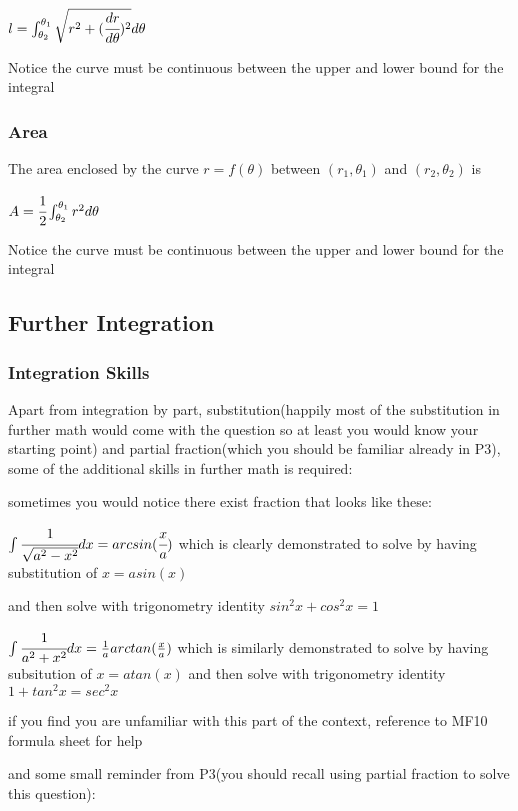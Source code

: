 \documentclass[]{article}
\begin{document}
\(l = \int^{\theta_1}_{\theta_2} \sqrt{r^2 + (\cfrac{dr}{d\theta})^2}d\theta\)

Notice the curve must be continuous between the upper and lower bound
for the integral

\subsubsection{Area}\label{header-n1018}

The area enclosed by the curve \(r = f(\theta)\) between
\((r_1,\theta_1)\) and \((r_2,\theta_2)\) is

\(A= \cfrac{1}{2}\int^{\theta_1}_{\theta_2} r^2d\theta\)

Notice the curve must be continuous between the upper and lower bound
for the integral

\subsection{Further Integration}\label{header-n1025}

\subsubsection{Integration Skills}\label{header-n1026}

Apart from integration by part, substitution(happily most of the
substitution in further math would come with the question so at least
you would know your starting point) and partial fraction(which you
should be familiar already in P3), some of the additional skills in
further math is required:

sometimes you would notice there exist fraction that looks like these:

\(\int \cfrac{1}{\sqrt{a^2 - x^2}}dx = arcsin(\cfrac{x}{a})\) which is
clearly demonstrated to solve by having substitution of \(x = a sin(x)\)

and then solve with trigonometry identity \(sin^2{x} + cos^2{x}=1\)

\(\int{\cfrac{1}{a^2 + x^2}}dx = \frac{1}{a}arctan(\frac{x}{a})\) which
is similarly demonstrated to solve by having subsitution of
\(x = a tan(x)\) and then solve with trigonometry identity
\(1+tan^2{x} = sec^2{x}\)

if you find you are unfamiliar with this part of the context, reference
to MF10 formula sheet for help

and some small reminder from P3(you should recall using partial fraction
to solve this question):
\end{document}
